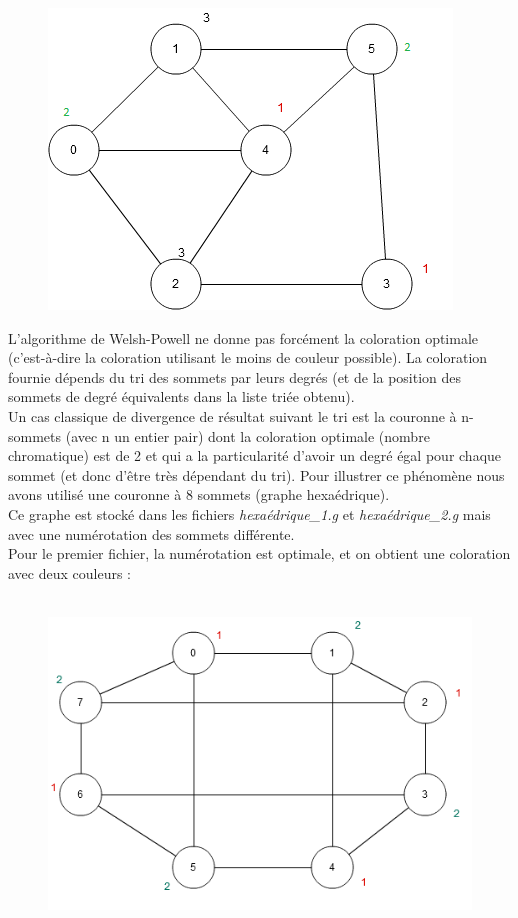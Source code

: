 \documentclass[12pt]{article}
\begin{document}
\begin{figure}[h]
\centering
\includegraphics[scale=1.25]{imgs/schema5.png}
\end{figure}

L'algorithme de Welsh-Powell ne donne pas forcément la coloration optimale (c’est-à-dire la coloration utilisant le moins de couleur possible). La coloration fournie dépends du tri des sommets par leurs degrés (et de la position des sommets de degré équivalents dans la liste triée obtenu).\\

Un cas classique de divergence de résultat suivant le tri est la couronne à n-sommets (avec n un entier pair) dont la coloration optimale (nombre chromatique) est de 2 et qui a la particularité d'avoir un degré égal pour chaque sommet (et donc d'être très dépendant du tri). Pour illustrer ce phénomène nous avons utilisé une couronne à 8 sommets (graphe hexaédrique).\\

Ce graphe est stocké dans les fichiers {\it hexaédrique\_1.g} et {\it hexaédrique\_2.g} mais avec une numérotation des sommets différente. \\

Pour le premier fichier, la numérotation est optimale, et on obtient une coloration avec deux couleurs :\\ \\

\begin{figure}[h]
\centering
\includegraphics[scale=.7]{imgs/schema6.png}
\end{figure}
\end{document}
